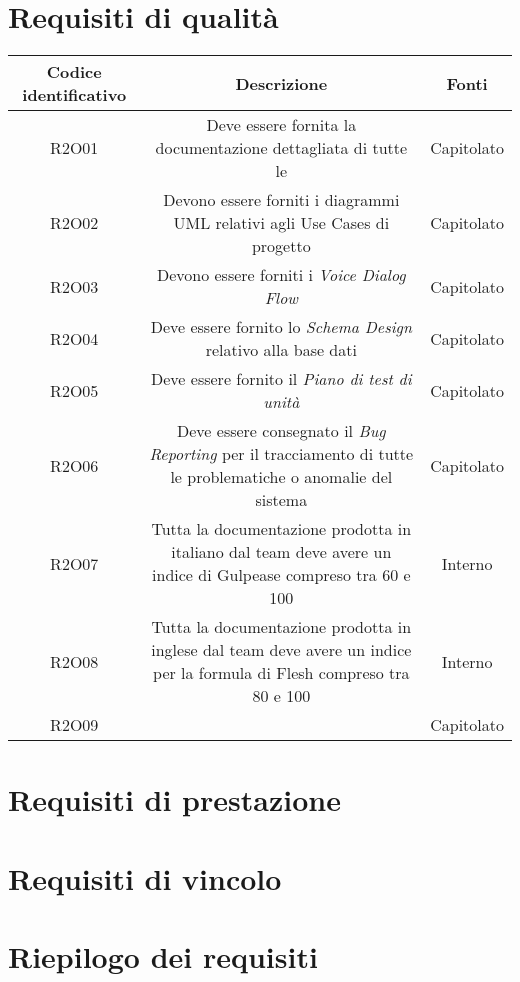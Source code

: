 \section{Requisiti di qualità}
\begin{tabularx}{\textwidth}{|C|C|C|}
	\hline
	\textbf{Codice identificativo} & \textbf{Descrizione} & \textbf{Fonti} \\
	\hline
	\endhead
	R2O01 & Deve essere fornita la documentazione dettagliata di tutte le  & Capitolato\\
	\hline
	R2O02 & Devono essere forniti i diagrammi UML relativi agli Use Cases di progetto  & Capitolato\\
	\hline
	R2O03 & Devono essere forniti i \textit{Voice Dialog Flow} & Capitolato\\
	\hline
	R2O04 & Deve essere fornito lo \textit{Schema Design} relativo alla base dati  & Capitolato\\
	\hline
	R2O05 & Deve essere fornito il \textit{Piano di test di unità} & Capitolato\\
	\hline
	R2O06 & Deve essere consegnato il \textit{Bug Reporting} per il tracciamento di
	tutte le problematiche o anomalie del sistema & Capitolato\\
	\hline
	R2O07 & Tutta la documentazione prodotta in italiano dal team deve avere
	un indice di Gulpease compreso tra 60 e 100 & Interno\\
	\hline
	R2O08 & Tutta la documentazione prodotta in inglese dal team deve avere
	un indice per la formula di Flesh compreso tra 80 e 100 & Interno\\
	\hline
	R2O09 &  & Capitolato\\
	\hline
\end{tabularx}

\section{Requisiti di prestazione}

\section{Requisiti di vincolo}


\section{Riepilogo dei requisiti}
